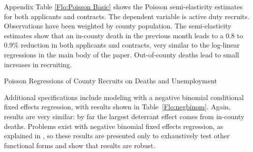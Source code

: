 \documentclass[12pt] {article}
\begin{document}

Appendix Table \ref{Flo:Poisson Basic} shows the Poisson semi-elasticity estimates for both applicants and contracts. The dependent variable is active duty recruits. Observations have been weighted by county population. The semi-elasticity estimates show that an in-county death in the previous month leads to a 0.8 to 0.9\% reduction in both applicants and contracts, very similar to the log-linear regressions in the main body of the paper. Out-of-county deaths lead to small increases in recruiting.


\begin{table}
\caption{Poisson Regressions of County Recruits on Deaths and Unemployment}
\label{Flo:Poisson Basic}
\scalebox{0.9}{}
\end{table}

\pagebreak{}
\clearpage{}
\begin{table}
\caption{}
\label{Flo:negbinom}
\scalebox{0.9}{}
\end{table}

Additional specifications include modeling %
with a negative binomial conditional fixed effects regression, with results shown in Table~\ref{Flo:negbinom}. Again, results are very similar: by far the largest deterrant effect comes from in-county deaths. Problems exist with negative binomial fixed effects regression, as explained in \cite{negbinom}, so these results are presented only to exhaustively test other functional forms and show that results are robust. 
\end{document}
